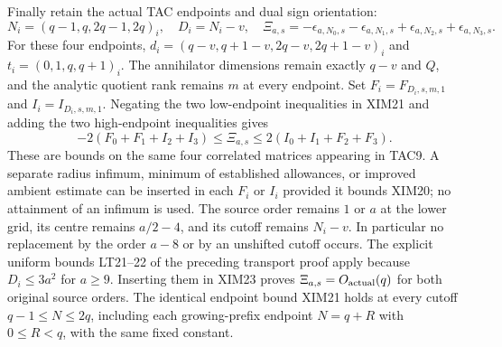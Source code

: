 Finally retain the actual TAC endpoints and dual sign orientation:
\[
 N_i=(q-1,q,2q-1,2q)_i,\quad D_i=N_i-v,\quad
 \Xi_{a,s}=-\epsilon_{a,N_0,s}-\epsilon_{a,N_1,s}
             +\epsilon_{a,N_2,s}+\epsilon_{a,N_3,s}.
 \tag{XIM22}
\]
For these four endpoints,
$d_i=(q-v,q+1-v,2q-v,2q+1-v)_i$ and
$t_i=(0,1,q,q+1)_i$. The annihilator dimensions remain exactly
$q-v$ and $Q$, and the analytic quotient rank remains $m$ at every
endpoint. Set $F_i=F_{D_i,s,m,1}$ and $I_i=I_{D_i,s,m,1}$.
Negating the two low-endpoint inequalities in XIM21 and adding the
two high-endpoint inequalities gives
\[
 \boxed{
 -2(F_0+F_1+I_2+I_3)
       \le\Xi_{a,s}\le
  2(I_0+I_1+F_2+F_3).}
 \tag{XIM23}
\]
These are bounds on the same four correlated matrices appearing in
TAC9. A separate radius infimum, minimum of established allowances,
or improved ambient estimate can be inserted in each $F_i$ or $I_i$
provided it bounds XIM20; no attainment of an infimum is used.
The source order remains $1$ or $a$ at the lower grid, its centre
remains $a/2-4$, and its cutoff remains $N_i-v$. In particular no
replacement by the order $a-8$ or by an unshifted cutoff occurs.
The explicit uniform bounds LT21--22 of the preceding transport proof
apply because $D_i\le3a^2$ for $a\ge9$. Inserting them in XIM23
proves $\Xi_{a,s}=O_{\rm actual}(q)$ for both original source orders.
The identical endpoint bound XIM21 holds at every cutoff
$q-1\le N\le2q$, including each growing-prefix endpoint $N=q+R$
with $0\le R<q$, with the same fixed constant.
\endgroup
